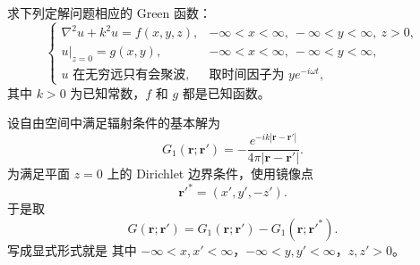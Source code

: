 \begin{question}[15分]

求下列定解问题相应的 Green 函数：
\[
\begin{cases}
\nabla^2u+k^2u=f(x,y,z), & -\infty<x<\infty,\ -\infty<y<\infty,\ z>0,\\[4pt]
u|_{z=0}=g(x,y), & -\infty<x<\infty,\ -\infty<y<\infty,\\[4pt]
u \text{ 在无穷远只有会聚波}, & \text{取时间因子为 } y e^{-i\omega t},
\end{cases}
\]
其中 $k>0$ 为已知常数，$f$ 和 $g$ 都是已知函数。

\begin{solution}

设自由空间中满足辐射条件的基本解为
\[
G_1(\mathbf r;\mathbf r')=-\frac{e^{-ik|\mathbf r-\mathbf r'|}}{4\pi|\mathbf r-\mathbf r'|}.
\]
为满足平面 $z=0$ 上的 Dirichlet 边界条件，使用镜像点
\[
\mathbf r'^*=(x',y',-z').
\]
于是取
\[
G(\mathbf r;\mathbf r')=G_1(\mathbf r;\mathbf r')-G_1(\mathbf r;\mathbf r'^*).
\]
写成显式形式就是
其中 $-\infty<x,x'<\infty$，$-\infty<y,y'<\infty$，$z,z'>0$。

\end{solution}
\end{question}

